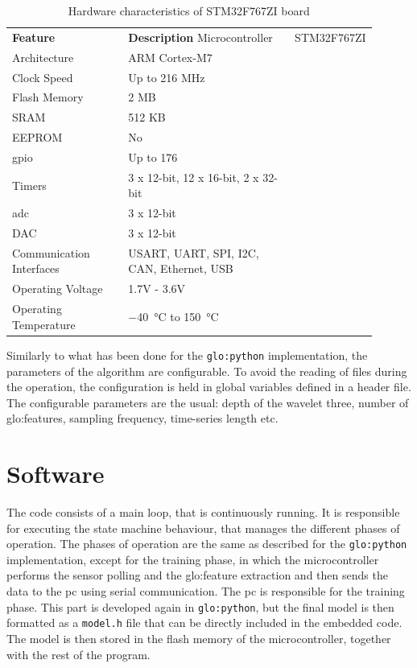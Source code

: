 \begin{longtable}{p{0.35\linewidth}p{0.55\linewidth}}
    \caption{Hardware characteristics of STM32F767ZI board}    \label{tab:stm32f767zi}\\
    \toprule
    \textbf{Feature} & \textbf{Description} \endfirsthead 
    \hline
    Microcontroller & STM32F767ZI \\
    Architecture & ARM Cortex-M7 \\
    Clock Speed & Up to 216 MHz \\
    Flash Memory & 2 MB \\
    SRAM & 512 KB \\
    EEPROM & No \\
    \gls{gpio} & Up to 176 \\
    Timers & 3 x 12-bit, 12 x 16-bit, 2 x 32-bit \\
    \gls{adc} & 3 x 12-bit \\
    DAC & 3 x 12-bit \\
    Communication Interfaces & USART, UART, SPI, I2C, CAN, Ethernet, USB \\
    Operating Voltage & 1.7V - 3.6V \\
    Operating Temperature & \SI{-40}{\celsius} to \SI{+150}{\celsius} \\
    \bottomrule    
\end{longtable}

Similarly to what has been done for the \texttt{\gls{glo:python}} implementation, the parameters of the algorithm are configurable. To avoid the reading of files during the operation, the configuration is held in global variables defined in a header file. The configurable parameters are the usual: depth of the wavelet three, number of \gls{glo:feature}s, sampling frequency, time-series length etc.

\section{Software}
The code consists of a main loop, that is continuously running. It is responsible for executing the state machine behaviour, that manages the different phases of operation. The phases of operation are the same as described for the \texttt{\gls{glo:python}} implementation, except for the training phase, in which the microcontroller performs the sensor polling and the \gls{glo:feature} extraction and then sends the data to the \gls{pc} using serial communication. The \gls{pc} is responsible for the training phase. This part is developed again in \texttt{\gls{glo:python}}, but the final model is then formatted as a \texttt{model.h} file that can be directly included in the embedded code. The model is then stored in the flash memory of the microcontroller, together with the rest of the program.

